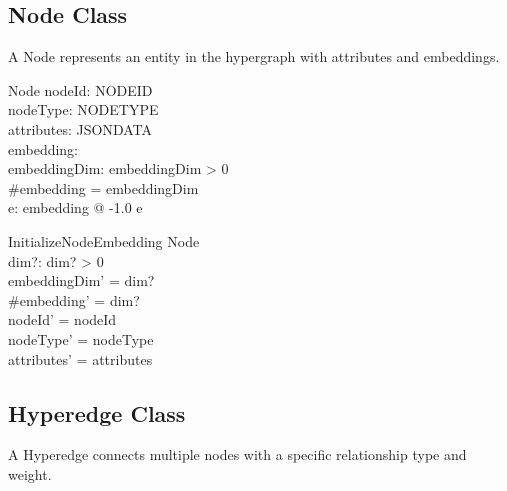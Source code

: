 \documentclass{article}
\begin{document}
\subsection{Node Class}

A Node represents an entity in the hypergraph with attributes and embeddings.

\begin{class}{Node}
    nodeId: NODEID \\
    nodeType: NODETYPE \\
    attributes: JSONDATA \\
    embedding: \seq \real \\
    embeddingDim: \nat
\where
    embeddingDim > 0 \\
    \#embedding = embeddingDim \\
    \forall e: \ran embedding @ -1.0 \leq e 
\end{class}

\begin{schema}{InitializeNodeEmbedding}
    \Delta Node \\
    dim?: \nat
\where
    dim? > 0 \\
    embeddingDim' = dim? \\
    \#embedding' = dim? \\
    nodeId' = nodeId \\
    nodeType' = nodeType \\
    attributes' = attributes
\end{schema}

\subsection{Hyperedge Class}

A Hyperedge connects multiple nodes with a specific relationship type and weight.
\end{document}
